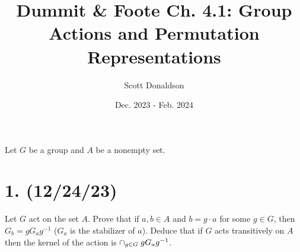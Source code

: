 \documentclass{article}
\title{Dummit \& Foote Ch. 4.1: Group Actions and Permutation Representations}
\author{Scott Donaldson}
\date{Dec. 2023 - Feb. 2024}
\begin{document}
\maketitle

Let $G$ be a group and $A$ be a nonempty set.

\section*{1. (12/24/23)}

Let $G$ act on the set $A$. Prove that if $a, b \in A$ and $b = g \cdot a$ for some $g \in G$, then $G_b = gG_ag^{-1}$ ($G_a$ is the stabilizer of $a$). Deduce that if $G$ acts transitively on $A$ then the kernel of the action is $\cap_{g \in G}\hspace{0.25em}gG_ag^{-1}$.
\end{document}
